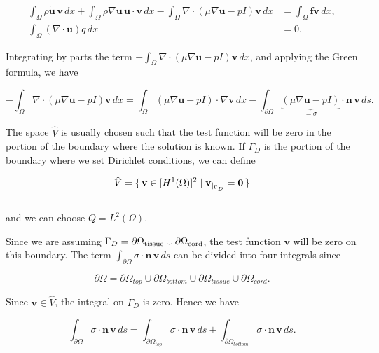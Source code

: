 \documentclass[a4paper,11pt,openright,twoside]{book}
\begin{document}
\begin{align}
\label{eq:ns:9}
\int_{\Omega} \rho \dot{\mathbf{u}} \, \mathbf{v} \, dx
+ \int_{\Omega} \rho \nabla \mathbf{u} \, \mathbf{u}   \cdot \mathbf{v} \, dx
- \int_{\Omega} \nabla \cdot (\mu \nabla \mathbf{u} - pI)\mathbf{v} \, dx
&= \int_{\Omega} \mathbf{f} \mathbf{v} \, dx, \\
\int_{\Omega}  (\nabla \cdot \mathbf{u}) q \, dx &= 0.
\end{align}

Integrating by parts the term $- \int_{\Omega} \nabla \cdot (\mu \nabla \mathbf{u} - pI)\mathbf{v} \, dx$, and applying the Green formula, we have

\begin{equation}
\label{eq:green}
- \int_{\Omega} \nabla \cdot (\mu \nabla \mathbf{u} - pI)\mathbf{v} \, dx =  \int_{\Omega} (\mu \nabla \mathbf{u} - pI) \cdot \nabla \mathbf{v} \, dx - \int_{\partial \Omega}  \underbrace{ (\mu \nabla \mathbf{u} - pI)}_{= \sigma} \cdot \mathbf{n} \, \mathbf{v} \, ds.
\end{equation}

The space $\hat{V}$ is usually chosen such that the test function will be zero in the portion of the boundary where the solution is known. If $\Gamma_D$ is the portion of the boundary where we set Dirichlet conditions, we can define

\begin{equation}
\hat{V} = \set{\mathbf{v} \in [H^1(\Omega)]^2 | \mathbf{v}_{|_{\Gamma_D}} = \mathbf{0}} 
\end{equation}
\\
and we can choose $Q = L^2(\Omega)$. 

Since we are assuming $\Gamma_D = \partial  \Omega_{\rm tissue} \cup  \partial \Omega_{\rm cord}$, the test function $\mathbf{v}$ will be zero on this boundary. The term $\int_{\partial \Omega} \sigma \cdot \mathbf{n} \,  \mathbf{v} \, ds$ can be divided into four integrals since

\begin{equation}
\partial \Omega = \partial \Omega_{top} \cup \partial \Omega_{bottom} \cup \partial \Omega_{tissue} \cup \partial \Omega_{cord}.
\end{equation}

Since $\mathbf{v} \in \hat{V}$, the integral on $\Gamma_D$ is zero. Hence we have

\begin{equation}
\int_{\partial \Omega}  \sigma \cdot \mathbf{n} \, \mathbf{v} \, ds
= \int_{\partial \Omega_{top}}   \sigma \cdot \mathbf{n} \, \mathbf{v} \, ds
+ \int_{\partial \Omega_{bottom}}  \sigma \cdot \mathbf{n} \, \mathbf{v} \, ds.
\end{equation}
\end{document}
